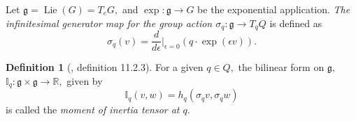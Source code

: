 \documentclass[12pt, letterpaper, reqno]{amsart}
\theoremstyle{definition}
\newtheorem{df}{Definition}
\theoremstyle{plain}
\theoremstyle{remark}
\begin{document}
Let $ \mathfrak{g}= \operatorname{Lie}(G)=T_eG, $ and $ \operatorname{exp} : \mathfrak{g}\rightarrow G $ be the exponential application. \textit{The infinitesimal generator map for the group action $ \sigma_q: \mathfrak{g}\rightarrow T_qQ $ } is defined as
$$ \sigma_q(v) = \frac{d}{d\epsilon} \Big|_{\epsilon=0} \left( q\cdot \operatorname{exp} (\epsilon v) \right).$$ 

\begin{df}[\cite{montgomery2002tour}, definition 11.2.3]
	For a given $ q\in Q, $ the bilinear form on $ \mathfrak{g}, $ $ \mathbb{I}_q: \mathfrak{g}\times \mathfrak{g}\rightarrow \mathbb{R}, $ given by
	$$ \mathbb{I}_q(v,w) = h_q(\sigma_q v, \sigma_q w) $$ 
	is called the \textit{moment of inertia tensor at $ q. $ } 
\end{df}

\nocite{*}

\end{document}
